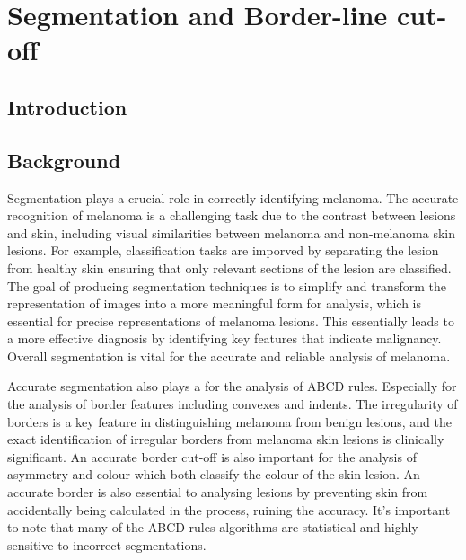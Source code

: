 \chapter{Segmentation and Border-line cut-off}

\section{Introduction}

\section{Background}
Segmentation plays a crucial role in correctly identifying melanoma. The accurate recognition of melanoma is a challenging task due to the contrast between lesions and skin, including visual similarities between melanoma and non-melanoma skin lesions\cite{Li2018a}. For example, classification tasks are imporved by separating the lesion from healthy skin ensuring that only relevant sections of the lesion are classified\cite{Albahli2020, bi2019}. The goal of producing segmentation techniques is to simplify and transform the representation of images into a more meaningful form for analysis, which is essential for precise representations of melanoma lesions\cite{Masood2013a}. This essentially leads to a more effective diagnosis by identifying key features that indicate malignancy\cite{Ali2020a}. Overall segmentation is vital for the accurate and reliable analysis of melanoma.

Accurate segmentation also plays a for the analysis of ABCD rules\cite{Lee2020}. Especially for the analysis of border features\cite{Pereira2020, Kaya2016} including convexes and indents. The irregularity of borders is a key feature in distinguishing melanoma from benign lesions, and the exact identification of irregular borders from melanoma skin lesions is clinically significant\cite{patil2021}. An accurate border cut-off is also important for the analysis of asymmetry and colour which both classify the colour of the skin lesion. An accurate border is also essential to analysing lesions by preventing skin from accidentally being calculated in the process, ruining the accuracy. It's important to note that many of the ABCD rules algorithms are statistical and highly sensitive to incorrect segmentations.


